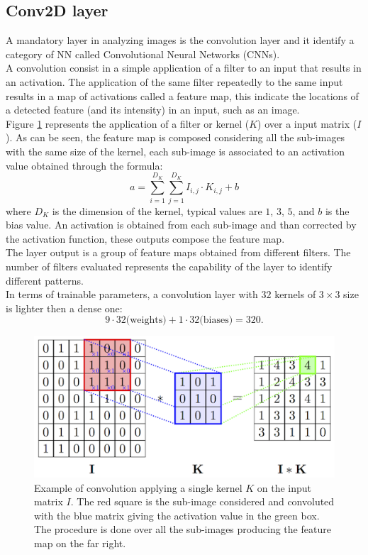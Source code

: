 \subsection*{Conv2D layer}
A mandatory layer in analyzing images is the convolution layer and it identify a category of NN called Convolutional Neural Networks (CNNs).\\
A convolution consist in a simple application of a filter to an input that results in an activation. The application of the same filter repeatedly to the same input results in a map of activations called a feature map, this indicate the locations of a detected feature (and its intensity) in an input, such as an image.\\
Figure \ref{fig:Conv2D} represents the application of a filter or kernel ($K$) over a input matrix ($I$). As can be seen, the feature map is composed considering all the sub-images with the same size of the kernel, each sub-image is associated to an activation value obtained through the formula:
\begin{equation}
    a = \sum_{i = 1}^{D_K}\sum_{j = 1}^{D_K} I_{i,j} \cdot K_{i,j} + b
\end{equation}
where $D_K$ is the dimension of the kernel, typical values are $1$, $3$, $5$, and $b$ is the bias value. An activation is obtained from each sub-image and than corrected by the activation function, these outputs compose the feature map.\\
The layer output is a group of feature maps obtained from different filters. The number of filters evaluated represents the capability of the layer to identify different patterns.\\

In terms of trainable parameters, a convolution layer with $32$ kernels of $3\times3$ size is lighter then a dense one:
\begin{equation*}
    9\cdot 32 \text{(weights)} + 1 \cdot 32 \text{(biases)} = 320.
\end{equation*}

\begin{figure}
	\centering
	\includegraphics[width=.6\textwidth]{IMG/Cap6/ConvScheme.png}
	\caption{Example of convolution applying a single kernel $K$ on the input matrix $I$. The red square is the sub-image considered and convoluted with the blue matrix giving the activation value in the green box. The procedure is done over all the sub-images producing the feature map on the far right.}
	\label{fig:Conv2D}
\end{figure}

